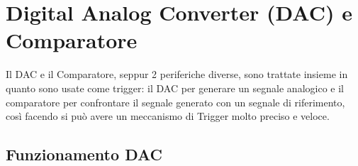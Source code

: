 \pagebreak
\section{Digital Analog Converter (DAC) e Comparatore}
Il DAC e il Comparatore, seppur 2 periferiche diverse, sono trattate insieme in quanto sono usate come trigger: il DAC per generare un segnale analogico e il comparatore per confrontare il segnale generato con un segnale di riferimento, così facendo si può avere un meccanismo di Trigger molto preciso e veloce.\\

\subsection{Funzionamento DAC}

